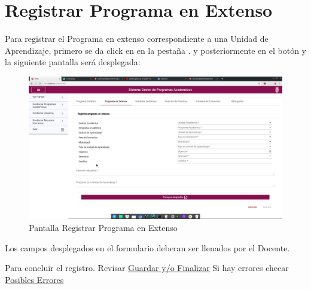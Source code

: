 \section{Registrar Programa en Extenso}

Para registrar el Programa en extenso correspondiente a una Unidad de Aprendizaje, primero se da click en en la pestaña . y posteriormente en el botón  y la siguiente pantalla será desplegada:

\begin{figure}[!h]
    \centering
    \hypertarget{9}{\includegraphics[width=0.5\linewidth]{images/SP6/RegistrarPS}}
    \caption{Pantalla Registrar Programa en Extenso}
\end{figure}

Los campos desplegados en el formulario deberan ser llenados por el Docente.

Para concluir el registro. Revisar \hyperlink{GuardarFinalizar}{Guardar y/o Finalizar}
Si hay errores checar \hyperlink{Errores}{Posibles Errores}